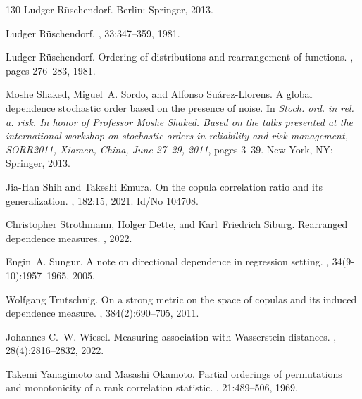 \documentclass{article}
\begin{document}
\begin{thebibliography}{130}
    Ludger R{\"u}schendorf.
    \newblock Berlin: Springer, 2013.

    Ludger {R{\"u}schendorf}.
    , 33:347--359, 1981.
    
    Ludger Rüschendorf.
    \newblock Ordering of distributions and rearrangement of functions.
    , pages 276--283, 1981.

    Moshe Shaked, Miguel~A. Sordo, and Alfonso Su{\'a}rez-Llorens.
    \newblock A global dependence stochastic order based on the presence of noise.
    \newblock In {\em Stoch. ord. in rel. a. risk. In honor of
    Professor Moshe Shaked.
    Based on the talks presented at the international workshop on stochastic orders in reliability and risk management, SORR2011,
    Xiamen, China, June 27--29, 2011}, pages 3--39. New York, NY: Springer, 2013.


    Jia-Han Shih and Takeshi Emura.
    \newblock On the copula correlation ratio and its generalization.
    , 182:15, 2021.
    \newblock Id/No 104708.
        
    Christopher Strothmann, Holger Dette, and Karl~Friedrich Siburg.
    \newblock Rearranged dependence measures.
    , 2022.
        
    Engin~A. Sungur.
    \newblock A note on directional dependence in regression setting.
    , 34(9-10):1957--1965, 2005.
    
    Wolfgang Trutschnig.
    \newblock On a strong metric on the space of copulas and its induced dependence
      measure.
    , 384(2):690--705, 2011.
        
    Johannes C.~W. Wiesel.
    \newblock Measuring association with {Wasserstein} distances.
    , 28(4):2816--2832, 2022.

    Takemi Yanagimoto and Masashi Okamoto.
    \newblock Partial orderings of permutations and monotonicity of a rank
    correlation statistic.
    , 21:489--506, 1969.
    
\end{thebibliography}
\end{document}
